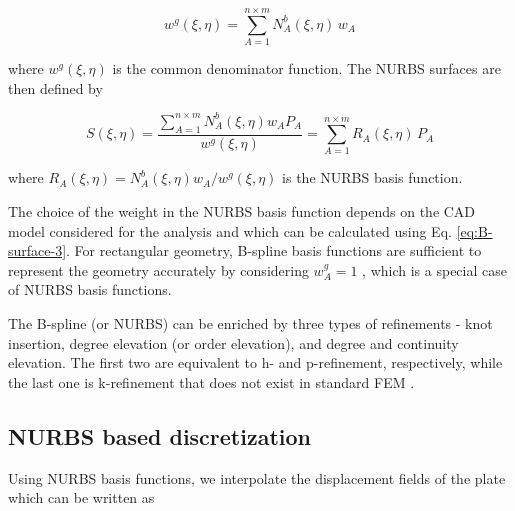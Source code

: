 \documentclass[3p,preprint,12pt]{elsarticle}
\begin{document}
\begin{equation}\label{eq:B-surface-2}
w^{g}(\xi,\eta)=\sum_{A=1}^{n\times m}N_{A}^{b}(\xi,\eta)\,w_{A}
\end{equation}

where $w^{g}(\xi,\eta)$ is the common denominator function. The NURBS surfaces are then defined by

\begin{equation}\label{eq:B-surface-3}
S(\xi,\eta)=\frac{\sum_{A=1}^{n\times m}N_{A}^{b}(\xi,\eta)w_{A}P_{A}}{w^{g}(\xi,\eta)}=\sum_{A=1}^{n\times m}R_{A}(\xi,\eta)\,P_{A}
\end{equation}  

where $R_{A}(\xi,\eta)=N_{A}^{b}(\xi,\eta)w_{A}/w^{g}(\xi,\eta)$ is the NURBS basis function.

The choice of the weight in the NURBS basis function depends on the CAD model considered for the analysis and which can be calculated \cite{piegl1997monographs,rogers2001introduction} using Eq. \cref{eq:B-surface-3}. For rectangular geometry, B-spline basis functions are sufficient to represent the geometry accurately by considering $w_{A}^{g} = 1$ \cite{piegl1997monographs,rogers2001introduction}, which is a special case of NURBS basis functions.

The B-spline (or NURBS) can be enriched by three types of refinements - knot insertion, degree elevation (or order elevation), and degree and continuity elevation. The first two are equivalent to h- and p-refinement, respectively, while the last one is k-refinement that does not exist in standard FEM \cite{hughes2005isogeometric}.

\subsection{NURBS based discretization}

Using NURBS basis functions, we interpolate the displacement fields of the plate which can be written as
\end{document}
